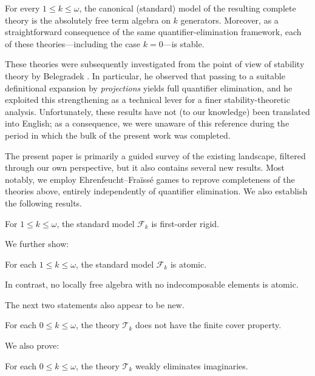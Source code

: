 \documentclass[a4paper,11pt]{article}
\begin{document}
For every \(1\leq k\leq \omega\), the canonical (standard) model of the resulting complete theory is the absolutely free term algebra on \(k\) generators. Moreover, as a straightforward consequence of the same quantifier-elimination framework, each of these theories---including the case \(k=0\)---is stable.

These theories were subsequently investigated from the point of view of stability theory by Belegradek \cite{Belegradek1988LocallyFree,Belegradek1989ForkingLocallyFree}. In particular, he observed that passing to a suitable definitional expansion by \emph{projections} yields full quantifier elimination, and he exploited this strengthening as a technical lever for a finer stability-theoretic analysis. Unfortunately, these results have not (to our knowledge) been translated into English; as a consequence, we were unaware of this reference during the period in which the bulk of the present work was completed.

The present paper is primarily a guided survey of the existing landscape, filtered through our own perspective, but it also contains several new results. Most notably, we employ Ehrenfeucht--Fra\"iss\'e games to reprove completeness of the theories above, entirely independently of quantifier elimination. We also establish the following results.

\begin{theorem}
For \(1\leq k\leq \omega\), the standard model \(\mathcal{F}_k\) is first-order rigid.
\end{theorem}

We further show:

\begin{theorem}
For each \(1\leq k\leq \omega\), the standard model \(\mathcal{F}_k\) is atomic.
\end{theorem}

In contrast, no locally free algebra with no indecomposable elements is atomic.

The next two statements also appear to be new.

\begin{theorem}
For each \(0\leq k\leq \omega\), the theory \(\mathcal{T}_k\) does not have the finite cover property.
\end{theorem}

We also prove:

\begin{theorem}
For each \(0\leq k\leq \omega\), the theory \(\mathcal{T}_k\) weakly eliminates imaginaries.
\end{theorem}
\end{document}
